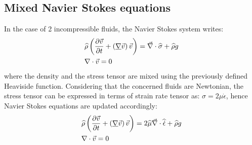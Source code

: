 \documentclass[11pt,a4paper]{article}
\begin{document}
\subsection{Mixed Navier Stokes equations}
In the case of 2 incompressible fluids, the Navier Stokes system writes: 
\begin{align}
\label{eq:NS_multiphase}
& \widehat{\rho} \left( \frac{\partial \vec{v}}{\partial t} + \left( \underline{\nabla} \vec{v} \right) \vec{v}  \right) = \vec{\nabla} \cdot \widehat{\sigma} + \widehat{\rho} g \\ 
& \nabla \cdot \vec{v} = 0
\end{align}
where the density and the stress tensor are mixed using the previously defined Heaviside function. Considering that the concerned fluids 
are Newtonian, the stress tensor can be expressed in terms of strain rate tensor as: $\sigma = 2\mu \dot{\epsilon}$, hence Navier Stokes 
equations are updated accordingly:
\begin{align}
\label{eq:NS_multiphase_2}
& \widehat{\rho} \left( \frac{\partial \vec{v}}{\partial t} + \left( \underline{\nabla} \vec{v} \right) \vec{v}  \right) = 2\widehat{\mu} \vec{\nabla} \cdot \widehat{\dot{\epsilon}} + \widehat{\rho} g \\ 
& \nabla \cdot \vec{v} = 0
\end{align}
\end{document}
